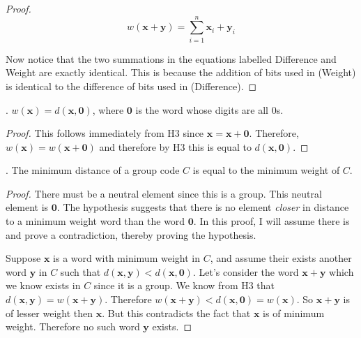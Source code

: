 \documentclass[twoside]{amsart}
\begin{document}
\begin{enumerate}[A.]
\begin{proof}
   \[
      w(\mathbf{x}+\mathbf{y}) = \sum_{i=1}^{n} \mathbf{x}_i+\mathbf{y}_i 
         \tag{Weight}
   \]

   Now notice that the two summations in the equations labelled
   Difference and Weight are exactly identical. This is because
   the addition of bits used in (Weight) is identical to the difference
   of bits used in (Difference).
   \end{proof}

   . $w(\mathbf{x})=d(\mathbf{x},\mathbf{0})$, where
   $\mathbf{0}$ is the word whose digits are all 0s.

   \noindent 
   \begin{proof}This follows immediately from H3 since
   $\mathbf{x}=\mathbf{x}+\mathbf{0}$. Therefore, $w(\mathbf{x})=
   w(\mathbf{x}+\mathbf{0})$ and therefore by H3 this is equal
   to $d(\mathbf{x},\mathbf{0})$.
   \end{proof}

   . The minimum distance of a group code $C$ is equal
   to the minimum weight of $C$. 

   \begin{proof}
   There must be a neutral element since this is a group. This
   neutral element is $\mathbf{0}$. The hypothesis suggests that
   there is no element \emph{closer} in distance to a minimum
   weight word than the word $\mathbf{0}$. In this proof,
   I will assume there is and prove a contradiction, thereby
   proving the hypothesis.

   Suppose $\mathbf{x}$ is a word with minimum weight in $C$, and
   assume their exists another word $\mathbf{y}$ in $C$
   such that $d(\mathbf{x},\mathbf{y}) <
   d(\mathbf{x},\mathbf{0})$.  Let's consider the word
   $\mathbf{x}+\mathbf{y}$ which we know exists in $C$ since it is a group.
   We know from H3 that 
   $d(\mathbf{x},\mathbf{y})=w(\mathbf{x}+\mathbf{y})$. 
   Therefore $w(\mathbf{x}+\mathbf{y}) < d(\mathbf{x},\mathbf{0}) =
   w(\mathbf{x})$. So $\mathbf{x}+\mathbf{y}$ is of lesser weight
   then $\mathbf{x}$. But this contradicts the fact that $\mathbf{x}$
   is of minimum weight. Therefore no such word $\mathbf{y}$ exists.
   \end{proof}



\end{enumerate}
\end{document}
